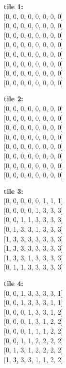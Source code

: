 \documentclass{article}
\begin{document}
\parbox{.20\linewidth}{
\begin{center}
	\textbf{tile 1:} \\[2pt]
  [0, 0, 0, 0, 0, 0, 0, 0] \\[0pt]
  [0, 0, 0, 0, 0, 0, 0, 0] \\[0pt]
  [0, 0, 0, 0, 0, 0, 0, 0] \\[0pt]
  [0, 0, 0, 0, 0, 0, 0, 0] \\[0pt]
  [0, 0, 0, 0, 0, 0, 0, 0] \\[0pt]
  [0, 0, 0, 0, 0, 0, 0, 0] \\[0pt]
  [0, 0, 0, 0, 0, 0, 0, 0] \\[0pt]
  [0, 0, 0, 0, 0, 0, 0, 0] \\[0pt]
\end{center}
}
\parbox{.20\linewidth}{
\begin{center}
	\textbf{tile 2:} \\[2pt]
  [0, 0, 0, 0, 0, 0, 0, 0] \\[0pt]
  [0, 0, 0, 0, 0, 0, 0, 0] \\[0pt]
  [0, 0, 0, 0, 0, 0, 0, 0] \\[0pt]
  [0, 0, 0, 0, 0, 0, 0, 0] \\[0pt]
  [0, 0, 0, 0, 0, 0, 0, 0] \\[0pt]
  [0, 0, 0, 0, 0, 0, 0, 0] \\[0pt]
  [0, 0, 0, 0, 0, 0, 0, 0] \\[0pt]
  [0, 0, 0, 0, 0, 0, 0, 0] \\[0pt]
\end{center}
}
\parbox{.20\linewidth}{
\begin{center}
	\textbf{tile 3:} \\[2pt]
  [0, 0, 0, 0, 0, 1, 1, 1] \\[0pt]
  [0, 0, 0, 0, 1, 3, 3, 3] \\[0pt]
  [0, 0, 1, 1, 3, 3, 3, 3] \\[0pt]
  [0, 1, 3, 3, 1, 3, 3, 3] \\[0pt]
  [1, 3, 3, 3, 3, 3, 3, 3] \\[0pt]
  [1, 3, 3, 3, 3, 3, 3, 3] \\[0pt]
  [1, 3, 3, 1, 3, 3, 3, 3] \\[0pt]
  [0, 1, 1, 3, 3, 3, 3, 3] \\[0pt]
\end{center}
}
\parbox{.20\linewidth}{
\begin{center}
	\textbf{tile 4:} \\[2pt]
  [0, 0, 1, 3, 3, 3, 3, 1] \\[0pt]
  [0, 0, 1, 3, 3, 3, 1, 1] \\[0pt]
  [0, 0, 0, 1, 3, 3, 1, 2] \\[0pt]
  [0, 0, 0, 1, 3, 1, 2, 2] \\[0pt]
  [0, 0, 0, 1, 1, 1, 2, 2] \\[0pt]
  [0, 0, 1, 1, 2, 2, 2, 2] \\[0pt]
  [0, 1, 3, 1, 2, 2, 2, 2] \\[0pt]
  [1, 3, 3, 3, 1, 1, 2, 2] \\[0pt]
\end{center}
}
\end{document}
